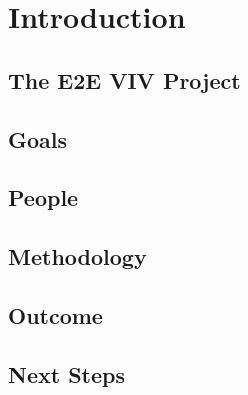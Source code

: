 \chapter{Introduction}
\label{chapter:introduction}

\section{The E2E VIV Project}
\section{Goals}
\section{People}
\section{Methodology}
\section{Outcome}
\section{Next Steps}
